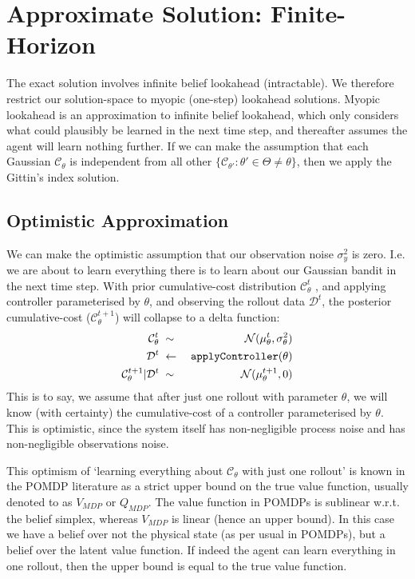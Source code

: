\documentclass[a4paper,10pt]{article}
\newcommand{\C}{\mathcal{C}}
\newcommand{\N}{\mathcal{N}}
\begin{document}
\section{Approximate Solution: Finite-Horizon} \label{sec:soln-optimism}

The exact solution involves infinite belief lookahead (intractable).
We therefore restrict our solution-space to myopic (one-step) lookahead solutions.
Myopic lookahead is an approximation to infinite belief lookahead,
which only considers what could plausibly be learned in the next time step,
and thereafter assumes the agent will learn nothing further.
If we can make the assumption that each Gaussian $\C_\theta$
is independent from all other $\{\C_{\theta'}:\theta' \in \Theta\neq\theta\}$,
then we apply the Gittin's index solution.

\subsection{Optimistic Approximation}
We can make the optimistic assumption that our observation noise $\sigma_y^2$ is zero.
I.e. we are about to learn everything there is to learn about our Gaussian bandit in the next time step.
With prior cumulative-cost distribution $\C^t_\theta$ , 
and applying controller parameterised by $\theta$, 
and observing the rollout data $\mathcal{D}^t$, 
the posterior cumulative-cost ($\C^{t+1}_\theta$) will collapse to a delta function:
\begin{eqnarray}
 \C^t_\theta &\;\sim\;& \N(\mu^t_\theta,\sigma^2_\theta) \\
 \mathcal{D}^t &\;\leftarrow\;& {\tt applyController}(\theta) \\
 \C^{t+1}_\theta|\mathcal{D}^t &\;\sim\;& \N(\mu^{t+1}_\theta,0)
\end{eqnarray}
This is to say, we assume that after just one rollout with parameter $\theta$, 
we will know (with certainty) the cumulative-cost of a controller parameterised by 
$\theta$. This is optimistic, since the system itself has non-negligible process 
noise and has non-negligible observations noise.

This optimism of `learning everything about $\C_\theta$ with just one 
rollout' is known in the POMDP literature as a strict upper bound on the true 
value function, usually denoted to as $V_{MDP}$ or $Q_{MDP}$. The value 
function in POMDPs is sublinear w.r.t. the belief simplex, whereas $V_{MDP}$ 
is linear (hence an upper bound). In this case we have a belief over not the 
physical state (as per usual in POMDPs), but a belief over the latent value 
function. If indeed the agent can learn everything in one rollout, then the 
upper bound is equal to the 
true value function.
\end{document}
